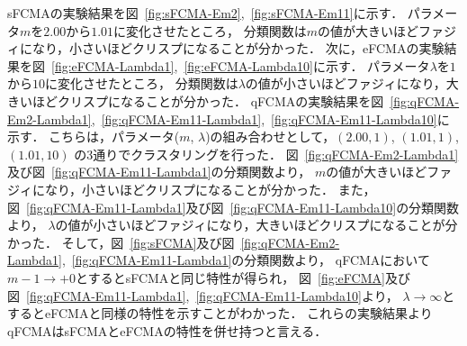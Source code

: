 \documentclass[twocolumn, a4paper]{icethesisabst}
\begin{document}
sFCMAの実験結果を図~\ref{fig:sFCMA-Em2},~\ref{fig:sFCMA-Em11}に示す．
パラメータ$m$を$2.00$から$1.01$に変化させたところ，
分類関数は$m$の値が大きいほどファジィになり，小さいほどクリスプになることが分かった．
次に，eFCMAの実験結果を図~\ref{fig:eFCMA-Lambda1},~\ref{fig:eFCMA-Lambda10}に示す．
パラメータ$\lambda$を$1$から$10$に変化させたところ，
分類関数は$\lambda$の値が小さいほどファジィになり，大きいほどクリスプになることが分かった．
qFCMAの実験結果を図~\ref{fig:qFCMA-Em2-Lambda1},~\ref{fig:qFCMA-Em11-Lambda1},~\ref{fig:qFCMA-Em11-Lambda10}に示す．
こちらは，パラメータ($m$, $\lambda$)の組み合わせとして，$(2.00, 1)$, $(1.01, 1)$, $(1.01, 10)$
の3通りでクラスタリングを行った．
図~\ref{fig:qFCMA-Em2-Lambda1}及び図~\ref{fig:qFCMA-Em11-Lambda1}の分類関数より，
$m$の値が大きいほどファジィになり，小さいほどクリスプになることが分かった．
また，図~\ref{fig:qFCMA-Em11-Lambda1}及び図~\ref{fig:qFCMA-Em11-Lambda10}の分類関数より，
$\lambda$の値が小さいほどファジィになり，大きいほどクリスプになることが分かった．
そして，図~\ref{fig:sFCMA}及び図~\ref{fig:qFCMA-Em2-Lambda1},~\ref{fig:qFCMA-Em11-Lambda1}の分類関数より，
qFCMAにおいて$m-1\rightarrow+0$とするとsFCMAと同じ特性が得られ，
図~\ref{fig:eFCMA}及び図~\ref{fig:qFCMA-Em11-Lambda1},~\ref{fig:qFCMA-Em11-Lambda10}より，
$\lambda\rightarrow\infty$とするとeFCMAと同様の特性を示すことがわかった．
これらの実験結果よりqFCMAはsFCMAとeFCMAの特性を併せ持つと言える．
\end{document}
